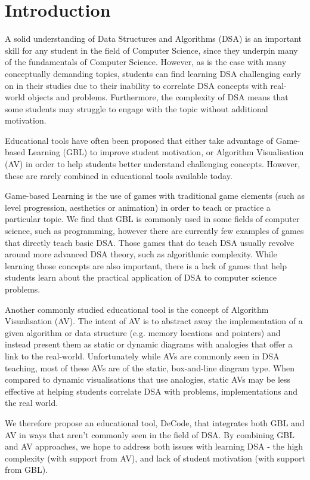 \documentclass[11pt]{article}
\begin{document}
\section{Introduction}
A solid understanding of Data Structures and Algorithms (DSA) is an important skill for any student in the field of Computer Science, since they underpin many of the fundamentals of Computer Science. However, as is the case with many conceptually demanding topics, students can find learning DSA challenging early on in their studies due to their inability to correlate DSA concepts with real-world objects and problems\cite{7600449}. Furthermore, the complexity of DSA means that some students may struggle to engage with the topic without additional motivation.\par
Educational tools have often been proposed that either take advantage of Game-based Learning (GBL) to improve student motivation, or Algorithm Visualisation (AV) in order to help students better understand challenging concepts. However, these are rarely combined in educational tools available today.\par
Game-based Learning is the use of games with traditional game elements (such as level progression, aesthetics or animation) in order to teach or practice a particular topic\cite{GBLTeaching}. We find that GBL is commonly used in some fields of computer science, such as programming, however there are currently few examples of games that directly teach basic DSA. Those games that do teach DSA usually revolve around more advanced DSA theory, such as algorithmic complexity. While learning those concepts are also important, there is a lack of games that help students learn about the practical application of DSA to computer science problems.\par
Another commonly studied educational tool is the concept of Algorithm Visualisation (AV). The intent of AV is to abstract away the implementation of a given algorithm or data structure (e.g. memory locations and pointers) and instead present them as static or dynamic diagrams with analogies that offer a link to the real-world. Unfortunately while AVs are commonly seen in DSA teaching, most of these AVs are of the static, box-and-line diagram type\cite{Esponda-Arguero:2010:TVD:1827707.1827710}. When compared to dynamic visualisations that use analogies, static AVs may be less effective at helping students correlate DSA with problems, implementations and the real world.\par
We therefore propose an educational tool, DeCode, that integrates both GBL and AV in ways that aren't commonly seen in the field of DSA. By combining GBL and AV approaches, we hope to address both issues with learning DSA - the high complexity (with support from AV), and lack of student motivation (with support from GBL).\par
\end{document}
